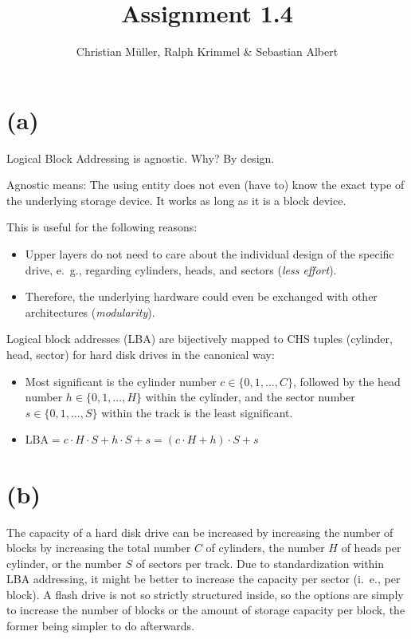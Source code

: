 \documentclass{article}
\begin{document}
\title{Assignment 1.4}
\author{Christian Müller, Ralph Krimmel \& Sebastian Albert }
\maketitle
\section*{(a)}
Logical Block Addressing is agnostic. Why? By design.

Agnostic means: The using entity does not even (have to) know the exact type of the underlying storage device. It works as long as it is a block device.

This is useful for the following reasons:
\begin{itemize}
\item Upper layers do not need to care about the individual design of the specific drive, e.~g., regarding cylinders, heads, and sectors (\emph{less effort}).
\item Therefore, the underlying hardware could even be exchanged with other architectures (\emph{modularity}).
\end{itemize}

Logical block addresses (LBA) are bijectively mapped to CHS tuples (cylinder, head, sector) for hard disk drives in the canonical way:
\begin{itemize}
\item Most significant is the cylinder number $c \in \{0, 1, ..., C\}$, followed by the head number $h \in \{0, 1, ..., H\}$ within the cylinder, and the sector number $s \in \{0, 1, ..., S\}$ within the track is the least significant.
\item $\text{LBA} = c \cdot H \cdot S + h \cdot S + s = (c \cdot H + h) \cdot S + s$
\end{itemize}
\section*{(b)}
The capacity of a hard disk drive can be increased by increasing the number of blocks by increasing the total number $C$ of cylinders, the number $H$ of heads per cylinder, or the number $S$ of sectors per track.
Due to standardization within LBA addressing, it might be better to increase the capacity per sector (i.~e., per block).
A flash drive is not so strictly structured inside, so the options are simply to increase the number of blocks or the amount of storage capacity per block, the former being simpler to do afterwards.
\end{document}

